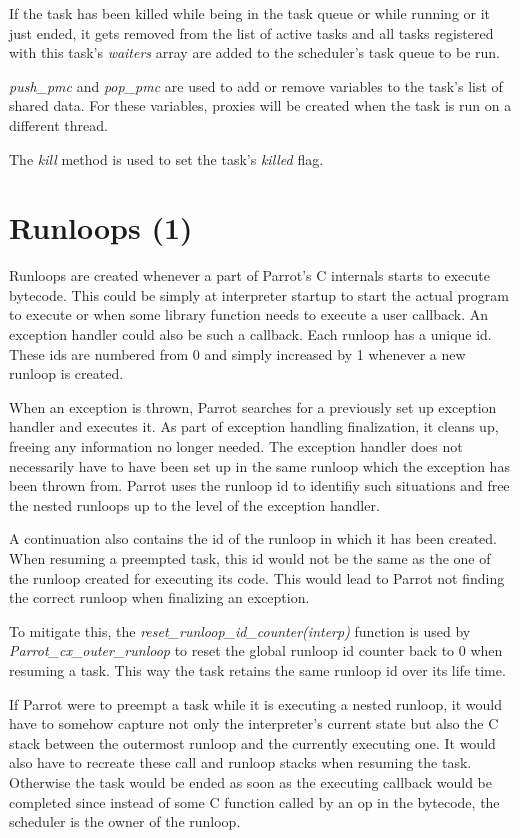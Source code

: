 \documentclass[bachelor,english]{hgbthesis}
\begin{document}
If the task has been killed while being in the task queue or while running or it just ended, it gets removed from the list of active tasks and all tasks registered with this task's \textit{waiters} array are added to the scheduler's task queue to be run.

\textit{push\_pmc} and \textit{pop\_pmc} are used to add or remove variables to the task's list of shared data. For these variables, proxies will be created when the task is run on a different thread.

The \textit{kill} method is used to set the task's \textit{killed} flag.

\section{Runloops (1)}

Runloops are created whenever a part of Parrot's C internals starts to execute bytecode. This could be simply at interpreter startup to start the actual program to execute or when some library function needs to execute a user callback. An exception handler could also be such a callback. Each runloop has a unique id. These ids are numbered from 0 and simply increased by 1 whenever a new runloop is created.

When an exception is thrown, Parrot searches for a previously set up exception handler and executes it. As part of exception handling finalization, it cleans up, freeing any information no longer needed. The exception handler does not necessarily have to have been set up in the same runloop which the exception has been thrown from. Parrot uses the runloop id to identifiy such situations and free the nested runloops up to the level of the exception handler.

A continuation also contains the id of the runloop in which it has been created. When resuming a preempted task, this id would not be the same as the one of the runloop created for executing its code. This would lead to Parrot not finding the correct runloop when finalizing an exception.

To mitigate this, the \textit{reset\_runloop\_id\_counter(interp)} function is used by \textit{Parrot\_cx\_outer\_runloop} to reset the global runloop id counter back to 0 when resuming a task. This way the task retains the same runloop id over its life time.

If Parrot were to preempt a task while it is executing a nested runloop, it would have to somehow capture not only the interpreter's current state but also the C stack between the outermost runloop and the currently executing one. It would also have to recreate these call and runloop stacks when resuming the task. Otherwise the task would be ended as soon as the executing callback would be completed since instead of some C function called by an op in the bytecode, the scheduler is the owner of the runloop.
\end{document}
